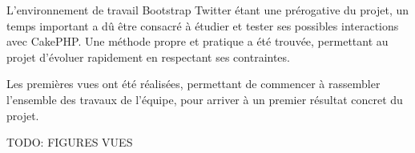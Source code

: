 L'environnement de travail Bootstrap Twitter étant une prérogative du projet, un temps important a dû être consacré à étudier et tester ses possibles interactions avec CakePHP. Une méthode propre et pratique a été trouvée, permettant au projet d'évoluer rapidement en respectant ses contraintes.

Les premières vues ont été réalisées, permettant de commencer à rassembler l'ensemble des travaux de l'équipe, pour arriver à un premier résultat concret du projet.

TODO: FIGURES VUES


